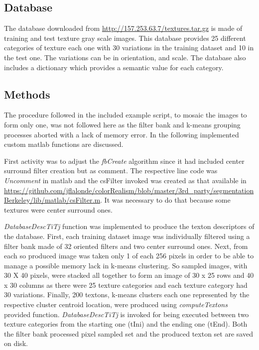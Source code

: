 \documentclass[10pt,twocolumn,letterpaper]{article}
\begin{document}
\subsection{Database}

The database downloaded from \url{http://157.253.63.7/textures.tar.gz} is made of training and test texture gray scale images. This database provides 25 different categories of texture each one with 30 variations in the training dataset and 10 in the test one. The variations can be in orientation, and scale. The database also includes a dictionary which provides a semantic value for each category.

\subsection{Methods}

The procedure followed in the included example script, \ie to mosaic the images to form only one,  was not followed here as the filter bank and k-means grouping processes aborted with a lack of memory error.  In the following implemented custom matlab functions are discussed.

First activity was to adjust the \textit{fbCreate} algorithm since it had included  center surround filter creation but as comment. The respective line code was \textit{Uncomment} in matlab and the csFilter invoked  was created as that available in \url{https://github.com/jflalonde/colorRealism/blob/master/3rd_party/segmentationBerkeley/lib/matlab/csFilter.m}. It was necessary to do that because some textures were center surround ones.

\textit{DatabaseDescTiTj} function was implemented to produce the texton descriptors of the database. First, each training dataset image was individually filtered using a filter bank made of 32 oriented filters and two center surround ones. Next, from each so produced image was taken only 1 of each 256 pixels in order to be able to manage a possible memory lack in k-means clustering. So sampled images, with 30 X 40 pixels, were stacked all together to form an image of 30 x 25 rows and 40 x 30 columns as there were 25 texture categories and each texture category had 30 variations. Finally, 200 textons, \ie k-means clusters each one represented by the respective cluster centroid location, were produced using \textit{computeTextons} provided function. \textit{DatabaseDescTiTj} is invoked for being executed between two texture categories from the starting one (tIni) and the ending one (tEnd). Both the filter bank processed pixel sampled set and the produced texton set are saved on disk.
\end{document}
